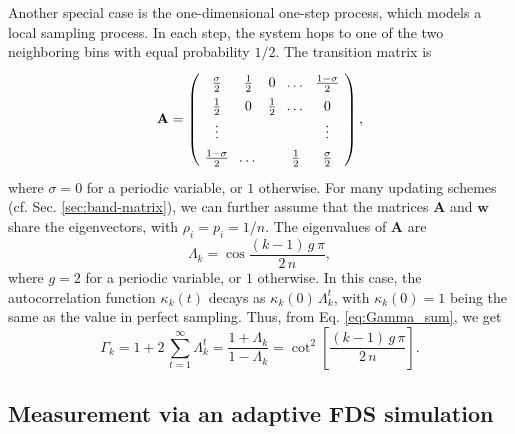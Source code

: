 \documentclass[reprint, floatfix]{revtex4-1}
\begin{document}
Another special case is the
one-dimensional one-step process\cite{vankampen},
which models a local sampling process.
In each step, the system hops to
one of the two neighboring bins
with equal probability $1/2$.
%
The transition matrix is
%
\begin{equation}
  \arraycolsep=3.6pt\def\arraystretch{1.4}
  \mathbf A
  =
  \left(
    \begin{array}{cccccccc}
      \frac \sigma 2 & \frac 1 2 & 0 & \dots & \frac {1 - \sigma} 2 \\
      \frac 1 2 & 0         & \frac 1 2 & \dots & 0 \\
      \vdots & &  & & \vdots \\
      \frac {1 - \sigma} 2 & \dots &  & \frac 1 2 & \frac \sigma 2
    \end{array}
  \right),
\notag
\end{equation}
%
where $\sigma = 0$ for a periodic variable, or $1$ otherwise.
%
For many updating schemes
(cf. Sec. \ref{sec:band-matrix}),
we can further assume that
the matrices $\mathbf A$ and $\mathbf w$
share the eigenvectors,
with $\rho_i = p_i = 1/n$.
%
The eigenvalues of $\mathbf A$ are
$$
  \Lambda_k
  =
  \cos \frac{ (k - 1) \, g \, \pi }
            {       2 \, n        }
  ,
$$
where
$g = 2$ for a periodic variable, or $1$ otherwise.
%
In this case,
the autocorrelation function $\kappa_k(t)$
decays as $\kappa_k(0) \, \Lambda_k^t$,
with $\kappa_k(0) = 1$ being the same as
the value in perfect sampling.
%
Thus,
from Eq. \eqref{eq:Gamma_sum}, we get
%
\begin{equation}
  \Gamma_k
  =
  1 + 2 \, \sum_{t = 1}^\infty \Lambda_k^t
  =
  \frac{ 1 + \Lambda_k }
       { 1 - \Lambda_k }
  =
  \cot^2 \left[
    \frac{ (k - 1) \, g \, \pi }
         { 2 \, n }
  \right]
  .
\label{eq:Gamma_onestep}
\end{equation}


\subsection{\label{sec:Gamma_measure}
Measurement via an adaptive FDS simulation
}
\end{document}
